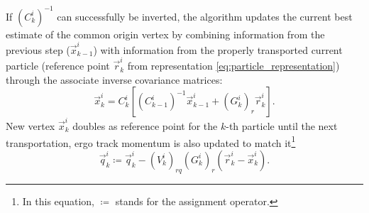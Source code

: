 

If ${(C^i_k)}^{-1}$ can successfully be inverted, the algorithm updates the current best estimate of the common origin vertex by combining information from the previous step ($\vec{x}_{k-1}^i$) with information from the properly transported current particle (reference point $\vec{r}_k^i$ from representation \eqref{eq:particle_representation}) through the associate inverse covariance matrices:
\begin{equation}
\vec{x}_k^i = C_k^i \left[
	{(C^i_{k-1})}^{-1} \vec{x}_{k-1}^i
	+ {(G_k^i)}_r \vec{r}_k^i
\right].
\label{eq:VF_new_vertex_final}
\end{equation}
New vertex $\vec{x}_k^i$ doubles as reference point for the $k$-th particle until the next transportation, ergo track momentum is also updated to match it\footnote{In this equation, $\coloneqq$ stands for the assignment operator.}
\begin{equation}
	\vec{q}_k^i \coloneqq
	\vec{q}_k^i
	-
	{(V_k^i)}_{rq}
	{(G_k^i)}_r
	\left(
		\vec{r}_k^i - \vec{x}_k^i
	\right).
	\label{eq:VF_momentum_final}
\end{equation}

